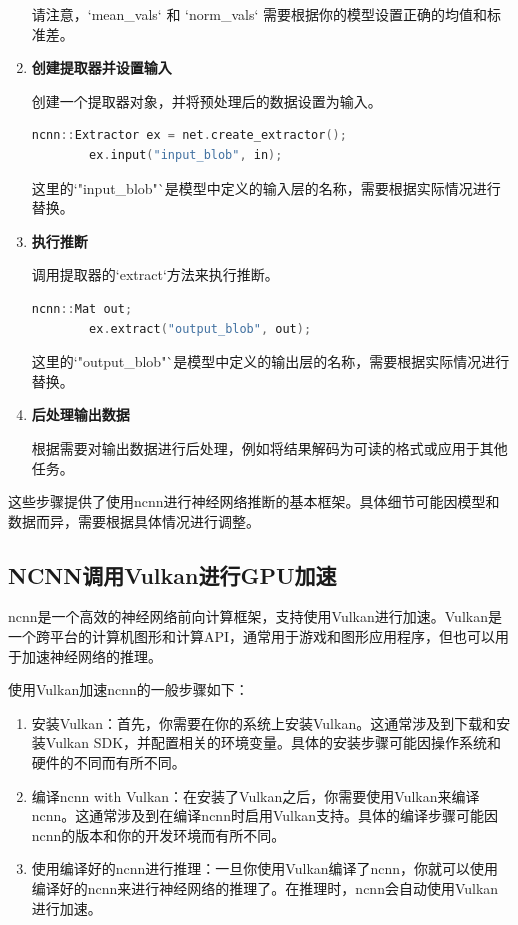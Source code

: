 \begin{enumerate}
	请注意，`mean\_vals` 和 `norm\_vals` 需要根据你的模型设置正确的均值和标准差。

	\item \textbf{创建提取器并设置输入}

	创建一个提取器对象，并将预处理后的数据设置为输入。

	\begin{lstlisting}[caption={设置输入输出},language=C++]
		ncnn::Extractor ex = net.create_extractor();
		ex.input("input_blob", in);
	\end{lstlisting}

	这里的`"input\_blob"`是模型中定义的输入层的名称，需要根据实际情况进行替换。

	\item \textbf{执行推断}

	调用提取器的`extract`方法来执行推断。

	\begin{lstlisting}[caption={推理},language=C++]
		ncnn::Mat out;
		ex.extract("output_blob", out);
	\end{lstlisting}

	这里的`"output\_blob"`是模型中定义的输出层的名称，需要根据实际情况进行替换。

	\item \textbf{后处理输出数据}

	根据需要对输出数据进行后处理，例如将结果解码为可读的格式或应用于其他任务。

\end{enumerate}

这些步骤提供了使用ncnn进行神经网络推断的基本框架。具体细节可能因模型和数据而异，需要根据具体情况进行调整。

\subsection{NCNN调用Vulkan进行GPU加速}

	ncnn是一个高效的神经网络前向计算框架，支持使用Vulkan进行加速。Vulkan是一个跨平台的计算机图形和计算API，通常用于游戏和图形应用程序，但也可以用于加速神经网络的推理。

	使用Vulkan加速ncnn的一般步骤如下：

	\begin{enumerate}
		\item 安装Vulkan：首先，你需要在你的系统上安装Vulkan。这通常涉及到下载和安装Vulkan SDK，并配置相关的环境变量。具体的安装步骤可能因操作系统和硬件的不同而有所不同。
		\item 编译ncnn with Vulkan：在安装了Vulkan之后，你需要使用Vulkan来编译ncnn。这通常涉及到在编译ncnn时启用Vulkan支持。具体的编译步骤可能因ncnn的版本和你的开发环境而有所不同。
		\item 使用编译好的ncnn进行推理：一旦你使用Vulkan编译了ncnn，你就可以使用编译好的ncnn来进行神经网络的推理了。在推理时，ncnn会自动使用Vulkan进行加速。
	\end{enumerate}

